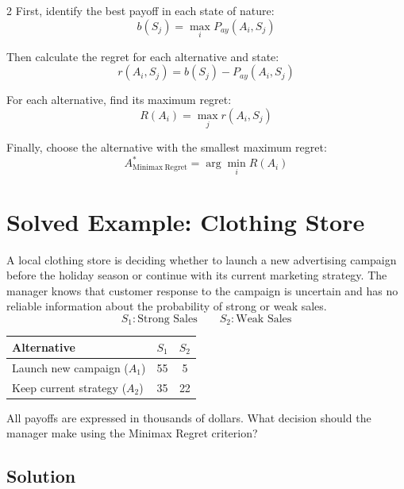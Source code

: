 \begin{multicols}{2}
		First, identify the best payoff in each state of nature:
		\[
		\boxed{
			b(S_j)
			=
			\max_i P_{ay}(A_i,S_j)
		}
		\]
		
		Then calculate the regret for each alternative and state:
		\[
		\boxed{
			r(A_i,S_j)
			=
			b(S_j)-P_{ay}(A_i,S_j)
		}
		\]
		
		For each alternative, find its maximum regret:
		\[
		\boxed{
			R(A_i)
			=
			\max_j r(A_i,S_j)
		}
		\]
		
		Finally, choose the alternative with the smallest maximum regret:
		\[
		\boxed{
			A^*_{\mathrm{Minimax\ Regret}}
			=
			\arg\min_i R(A_i)
		}
		\]
		
		
		\section{Solved Example: Clothing Store}
		
		A local clothing store is deciding whether to launch a new advertising
		campaign before the holiday season or continue with its current marketing
		strategy. The manager knows that customer response to the campaign is
		uncertain and has no reliable information about the probability of strong
		or weak sales.
		\[ S_1 : \text{Strong Sales} \qquad S_2 : \text{Weak Sales} \]
		\begin{center}
			\renewcommand{\arraystretch}{1.3}
			\small
			\begin{tabular}{lcc}
				\toprule
				Alternative & $S_1$ & $S_2$ \\
				\midrule
				Launch new campaign ($A_1$) & 55 & 5 \\
				Keep current strategy ($A_2$) & 35 & 22 \\
				\bottomrule
			\end{tabular}
		\end{center}
		
		All payoffs are expressed in thousands of dollars. What decision should the manager make using the Minimax Regret criterion?
		
		
		\subsection{Solution}
		

\end{multicols}
